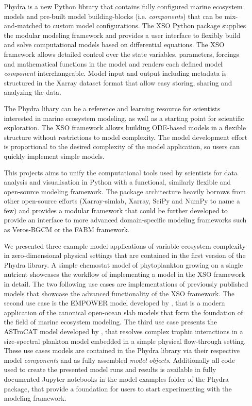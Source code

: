 \documentclass[journal abbreviation, manuscript]{copernicus}
\begin{document}
Phydra is a new Python library that contains fully configured marine ecosystem models and pre-built model building-blocks (i.e. \textit{components}) that can be mix-and-matched to custom model configurations. The XSO Python package supplies the modular modeling framework and provides a user interface to flexibly build and solve computational models based on differential equations. The XSO framework allows detailed control over the state variables, parameters, forcings and mathematical functions in the model and renders each defined model \textit{component} interchangeable. Model input and output including metadata is structured in the Xarray dataset format that allow easy storing, sharing and analyzing the data.

The Phydra libary can be a reference and learning resource for scientists interested in marine ecosystem modeling, as well as a starting point for scientific exploration. The XSO framework allows building ODE-based models in a flexible structure without restrictions to model complexity. The model development effort is proportional to the desired complexity of the model application, so users can quickly implement simple models.

This projects aims to unify the computational tools used by scientists for data analysis and visualisation in Python with a functional, similarly flexible and open-source modeling framework. The package architecture heavily borrows from other open-source efforts (Xarray-simlab, Xarray, SciPy and NumPy to name a few) and provides a modular framework that could be further developed to provide an interface to more advanced domain-specific modeling frameworks such as Veros-BGCM or the FABM framework.

We presented three example model applications of variable ecosystem complexity in zero-dimensional physical settings that are contained in the first version of the Phydra library. A simple chemostat model of phytoplankton growing on a single nutrient showcases the workflow of implementing a model in the XSO framework in detail. The two following use cases are implementations of previously published models that showcase the advanced functionality of the XSO framework. The second use case is the EMPOWER model developed by \citet{Anderson2015c}, that is a modern application of the canonical open-ocean slab models that form the foundation of the field of marine ecosystem modeling. The third use case presents the ASTroCAT model developed by \citet{Banas2011b}, that resolves complex trophic interactions in a size-spectral plankton model embedded in a simple physical flow-through setting. These use cases models are contained in the Phydra library via their respective model \textit{components} and as fully assembled \textit{model objects}. Additionally all code used to create the presented model runs and results is available in fully documented Jupyter notebooks in the model examples folder of the Phydra package, that provide a foundation for users to start experimenting with the modeling framework. 
\end{document}
